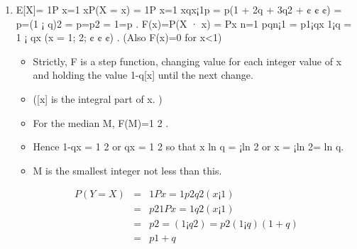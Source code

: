 \documentclass[a4paper,12pt]{article}
\begin{document}
\begin{enumerate}
    \item 

E[X]=
1P
x=1
xP(X = x) =
1P
x=1
xqx¡1p = p(1 + 2q + 3q2 + ¢ ¢ ¢)
= p=(1 ¡ q)2 = p=p2 = 1=p .
F(x)=P(X · x) =
Px
n=1
pqn¡1 = p1¡qx
1¡q = 1 ¡ qx (x = 1; 2; ¢ ¢ ¢) .
(Also F(x)=0 for x<1)
\begin{itemize}
    \item Strictly, F is a step function, changing value for each integer value of x and holding the value
1-q[x] until the next change.
\item ([x] is the integral part of x. )
\item For the median M, F(M)=1
2 .
\item Hence 1-qx = 1
2 or qx = 1
2 so that x ln q = ¡ln 2 or x = ¡ln 2= ln q. 
\item M is the smallest integer not
less than this.
\end{itemize}

\begin{eqnarray*}
P(Y=X)  
&=&
1P
x=1
p2q2(x¡1) \\&=& p2
1P
x=1
q2(x¡1) \\&=& p2=(1 ¡ q2) = p2
(1¡q)(1+q) \\ &=& p
1+q
\end{eqnarray*}

\end{enumerate}
\end{document}
